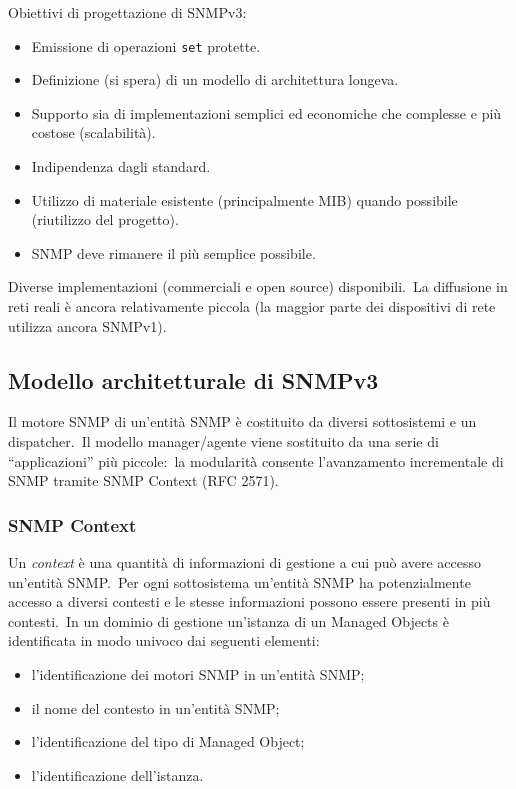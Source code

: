 Obiettivi di progettazione di SNMPv3:
\begin{itemize}
    \item Emissione di operazioni \texttt{set} protette.
    \item Definizione (si spera) di un modello di architettura longeva.
    \item Supporto sia di implementazioni semplici ed economiche che complesse e più costose (scalabilità).
    \item Indipendenza dagli standard.
    \item Utilizzo di materiale esistente (principalmente MIB) quando possibile (riutilizzo del progetto).
    \item SNMP deve rimanere il più semplice possibile.
\end{itemize}

\noindent Diverse implementazioni (commerciali e open source) disponibili.\
La diffusione in reti reali è ancora relativamente piccola (la maggior parte dei dispositivi di rete utilizza ancora SNMPv1).

\subsection{Modello architetturale di SNMPv3}

Il motore SNMP di un'entità SNMP è costituito da diversi sottosistemi e un dispatcher.\
Il modello manager/agente viene sostituito da una serie di ``applicazioni'' più piccole:\ la modularità consente l'avanzamento incrementale di SNMP tramite SNMP Context (RFC 2571).

\subsubsection{SNMP Context}

Un \textit{context} è una quantità di informazioni di gestione a cui può avere accesso un'entità SNMP.\
Per ogni sottosistema un'entità SNMP ha potenzialmente accesso a diversi contesti e le stesse informazioni possono essere presenti in più contesti.\
In un dominio di gestione un'istanza di un Managed Objects è identificata in modo univoco dai seguenti elementi:
\begin{itemize}
    \item l'identificazione dei motori SNMP in un'entità SNMP;
    \item il nome del contesto in un'entità SNMP;
    \item l'identificazione del tipo di Managed Object;
    \item l'identificazione dell'istanza.
\end{itemize}

